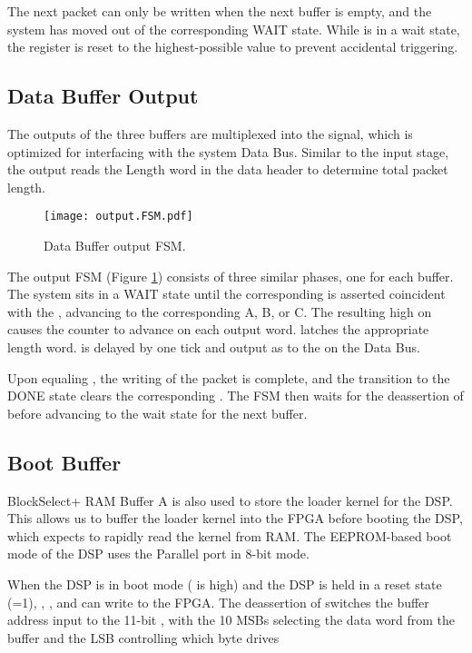 The next packet can only be written when the next buffer is empty, and
the system has moved out of the corresponding WAIT state. While
 is in a wait state, the  register is
reset to the highest-possible value to prevent accidental triggering.
      
\subsection{Data Buffer Output}
      
The outputs of the three buffers are multiplexed into the
 signal, which is optimized for interfacing with
the system Data Bus. Similar to the input stage, the output reads the
Length word in the data header to determine total packet length.

\begin{figure}[h!]
  \texttt{[image: output.FSM.pdf]}
  \caption{Data Buffer output FSM.}
  \label{OutputFSM}
\end{figure}
The output FSM  (Figure \ref{OutputFSM}) consists of
three similar phases, one for each buffer. The system sits in a WAIT
state until the corresponding  is asserted
coincident with the , advancing to the corresponding
A, B, or C. The resulting high on  causes the
 counter to advance on each output word.
 latches the appropriate length word.
 is delayed by one tick and output as
 to the  on the Data Bus.

Upon  equaling , the writing
of the packet is complete, and the transition to the DONE state clears
the corresponding . The FSM then waits for the
deassertion of  before advancing to the wait state for
the next buffer.
   
\subsection{Boot Buffer}

BlockSelect+ RAM Buffer A is also used to store the loader kernel for
the DSP. This allows us to buffer the loader kernel into the FPGA
before booting the DSP, which expects to rapidly read the kernel from
RAM. The EEPROM-based boot mode of the DSP uses the Parallel port in
8-bit mode.

When the DSP is in boot mode ( is high) and the DSP is
held in a reset state (=1), ,
, and  can write to the FPGA. The
deassertion of  switches the buffer address input to
the 11-bit , with the 10 MSBs selecting the data word
from the buffer and the LSB controlling which byte drives

